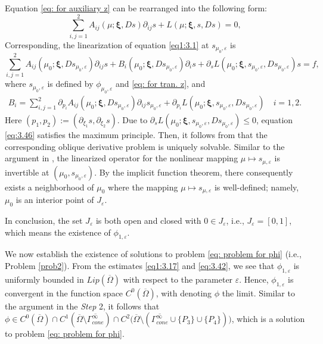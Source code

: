 \documentclass[reqno,12pt]{amsart}
\numberwithin{equation}{section}
\begin{document}
Equation \eqref{eq: for auxiliary z} can be rearranged into the following form:
\begin{equation}\label{eq1:3.1}
 \sum^{2}_{i,j=1} A_{ij}(\mu;\bm{\xi},Ds)\partial_{ij}s+L(\mu;\bm{\xi},s,Ds)=0,
\end{equation}
Corresponding, the linearization of equation \eqref{eq1:3.1} at $s_{\mu_{0},\varepsilon}$ is
\begin{equation}\label{eq:3.46}
	 \sum^{2}_{i,j=1} A_{ij}(\mu_0;\bm{\xi},Ds_{\mu_{0},\varepsilon})\partial_{ij}s+B_i(\mu_0;\bm{\xi},Ds_{\mu_{0},\varepsilon})\partial_i s+\partial_{s}L(\mu_{0};\bm{\xi},s_{\mu_{0},\varepsilon},Ds_{\mu_{0},\varepsilon})s=f,
\end{equation}
where $s_{\mu_{0},\varepsilon}$ is defined by $\phi_{\mu_{0},\varepsilon}$ and \eqref{eq: for tran. z}, and
\begin{align*}
	B_{i}=\sum^{2}_{i,j=1}\partial_{p_i}A_{ij}(\mu_{0};\bm{\xi},Ds_{\mu_{0},\varepsilon})\partial_{ij}s_{\mu_{0},\varepsilon}+\partial_{p_i}L(\mu_{0};\bm{\xi},s_{\mu_{0},\varepsilon},Ds_{\mu_{0},\varepsilon})\quad\text{$i=1,2$}.
\end{align*}
Here $(p_1,p_2):=(\partial_{\xi_1}s,\partial_{\xi_2}s)$. Due to $\partial_{s}L(\mu_{0};\bm{\xi},s_{\mu_{0},\varepsilon},Ds_{\mu_{0},\varepsilon})\leq0$, equation \eqref{eq:3.46} satisfies the maximum principle. Then, it follows from \cite[Appendix]{CQ19} that the corresponding oblique derivative problem is uniquely solvable. Similar to the argument in \cite{CQ19}, the linearized operator for the nonlinear mapping $\mu\mapsto s_{\mu,\varepsilon}$ is invertible at $(\mu_{0},s_{\mu_{0},\varepsilon})$. By the implicit function theorem, there consequently exists a neighborhood of $\mu_{0}$ where the mapping $\mu\mapsto s_{\mu,\varepsilon}$ is well-defined; namely, $\mu_{0}$ is an interior point of $J_{\varepsilon}$.

In conclusion, the set $J_{\varepsilon}$ is both open and closed with $0\in J_{\varepsilon}$, i.e., $J_{\varepsilon}=[0,1]$, which means the existence of $\phi_{1,\varepsilon}$.

We now establish the existence of solutions to problem \eqref{eq: problem for phi} (i.e., Problem \ref{prob2}). 
From the estimates \eqref{eq1:3.17} and \eqref{eq:3.42}, we see that $\phi_{1,\varepsilon}$ is uniformly bounded in $Lip(\overline{\Omega})$ with respect to the parameter $\varepsilon$. Hence, $\phi_{1,\varepsilon}$ is convergent in the function space $C^0(\overline{\Omega})$, with denoting $\phi$ the limit. Similar to the argument in the \textit{Step} 2, it follows that $\phi\in C^{0}(\overline{\Omega})\cap C^{1}(\overline{\Omega}\setminus\overline{\Gamma_{cone}^{\infty}})\cap C^2\big(\overline{\Omega}\setminus(\overline{\Gamma_{cone}^{\infty}}\cup\{P_3\}\cup\{P_4\})\big)$, which is a solution to problem \eqref{eq: problem for phi}. 
\end{document}
